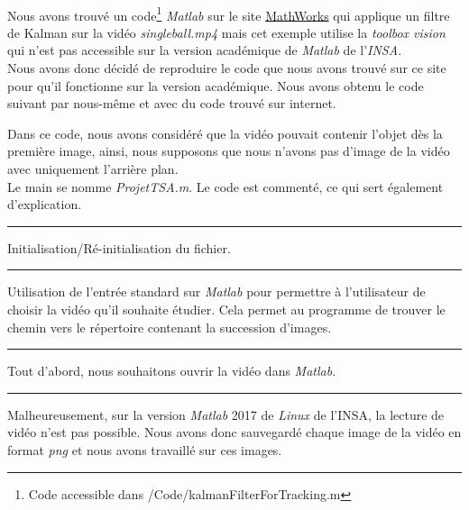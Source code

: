 \paragraph{}

	Nous avons trouvé un code\footnote{Code accessible dans /Code/kalmanFilterForTracking.m} \emph{Matlab} sur le site \href{https://fr.mathworks.com/help/vision/examples/using-kalman-filter-for-object-tracking.html}{MathWorks} qui applique un filtre de Kalman sur la vidéo \emph{singleball.mp4} mais cet exemple utilise la \emph{toolbox vision} qui n'est pas accessible sur la version académique de \emph{Matlab} de l'\emph{INSA}. \\
\indent Nous avons donc décidé de reproduire le code que nous avons trouvé sur ce site pour qu'il fonctionne sur la version académique. Nous avons obtenu le code suivant par nous-même et avec du code trouvé sur internet.
	
	Dans ce code, nous avons considéré que la vidéo pouvait contenir l'objet dès la première image, ainsi, nous supposons que nous n'avons pas d'image de la vidéo avec uniquement l'arrière plan. \\
	
	Le main se nomme \emph{ProjetTSA.m}. Le code est commenté, ce qui sert également d'explication. \\

\hrule
\phantom{}
\phantom{}

	Initialisation/Ré-initialisation du fichier.
	
\lstset{caption=ProjetTSA.m}


\hrule
\phantom{}
\phantom{}

	Utilisation de l'entrée standard sur \emph{Matlab} pour permettre à l'utilisateur de choisir la vidéo qu'il souhaite étudier. Cela permet au programme de trouver le chemin vers le répertoire contenant la succession d'images.
	
\lstset{caption=ProjetTSA.m}


\hrule
\phantom{}
\phantom{}
	
Tout d'abord, nous souhaitons ouvrir la vidéo dans \emph{Matlab}.

\lstset{caption=ProjetTSA.m}


\hrule
\phantom{}
\phantom{}

Malheureusement, sur la version \emph{Matlab} 2017 de \emph{Linux} de l'INSA, la lecture de vidéo n'est pas possible. Nous avons donc sauvegardé chaque image de la vidéo en format \emph{png} et nous avons travaillé sur ces images.

